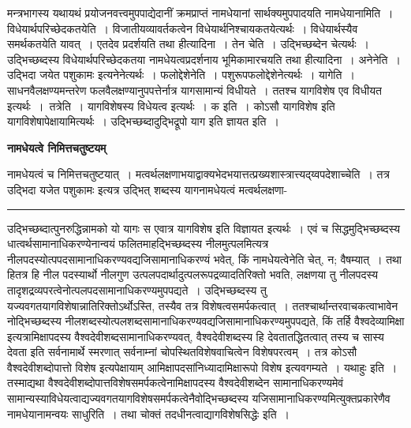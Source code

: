 \documentclass[11pt, openany]{book}
\begin{document}
 मन्त्रभागस्य यथायथं प्रयोजनवत्त्वमुपपाद्येदानीं क्रमप्राप्तं नामधेयानां  सार्थक्यमुपपादयति  {\br नामधेयानामिति~। विधेयार्थपरिच्छेदकतयेति~।} विजातीयव्यावर्तकत्वेन विधेयार्थनिश्चायकतयेत्यर्थः~। विधेयार्थस्यैव  समर्थकतयेति यावत्~। एतदेव प्रदर्शयति  {\br तथा हीत्यादिना~।} तेन चेति~। उद्भिच्छब्देन चेत्यर्थः~। उद्भिच्छब्दस्य विधेयार्थपरिच्छेदकतया नामधेयत्वप्रदर्शनाय भूमिकामारचयति {\br तथा हीत्यादिना~। अनेनेति~।} {\qt उद्भिदा जयेत पशुकामः} इत्यनेनेत्यर्थः~। {\br फलोद्देशेनेति~।}
पशुरूपफलोद्देशेनेत्यर्थः~। यागेति~। साधनवैलक्षण्यमन्तरेण फलवैलक्षण्यानुपपत्तेर्नात्र यागसामान्यं विधीयते~। ततश्च यागविशेष एव विधीयत इत्यर्थः~।~{\br तत्रेति~।} 
यागविशेषस्य विधेयत्व इत्यर्थः~। {\br क इति~।} कोऽसौ यागविशेष इति यागविशेषापेक्षायामित्यर्थः~। {\br उद्भिच्छब्दादुद्भिद्रूपो याग इति ज्ञायत इति~।}
\newpage
\fancyhead[LO]{[नामधेयत्वे नि० ]}
\begin{center}
 \textbf{नामधेयत्वे निमित्तचतुष्टयम् }   
\end{center}
 
{\bl नामधेयत्वं च निमित्तचतुष्टयात्~। मत्वर्थलक्षणाभयाद्वाक्यभेदभयात्तत्प्रख्यशास्त्रात्त्यद्य्वपदेशाच्चेति~। तत्र {\qtl उद्भिदा यजेत पशुकामः} इत्यत्र {\qtl उद्भित्}  शब्दस्य यागनामधेयत्वं मत्वर्थलक्षणा-\\ }
\hrule
\vspace{3mm}
\noindent
उद्भिच्छब्दात्पुनरुद्धिन्नामको यो यागः स एवात्र यागविशेष इति विज्ञायत  इत्यर्थः~। एवं च सिद्धमुद्भिच्छब्दस्य धात्वर्थसामानाधिकरण्येनान्वयं फलितमाहद्भिच्छब्दस्य नीलमुत्पलमित्यत्र नीलपदस्योत्पपदसामानाधिकरण्यवद्यजिसामानाधिकरण्यं भवेत्, किं नामधेयत्वेनेति चेत्, {\qt न}; वैषम्यात्~। तथा हि\textendash तत्र हि {\qt नील} पदस्यार्थो नीलगुण उत्पलपदार्थादुत्पलरूपद्रव्यादतिरिक्तो भवति, लक्षणया तु नीलपदस्य तादृशद्रव्यपरत्वेनोत्पलपदसामानाधिकरण्यमुपपद्यते~। उद्भिच्छब्दस्य तु यज्यवगतयागविशेषान्नातिरिक्तोऽर्थोऽस्ति, तस्यैव तत्र विशेषत्वसमर्पकत्वात्~।
ततश्चार्थान्तरवाचकत्वाभावेन नोद्भिच्छब्दस्य नीलशब्दस्योत्पलशब्दसामानाधिकरण्यवद्यजिसामानाधिकरण्यमुपपद्यते, किं तर्हि {\qt वैश्वदेव्यामिक्षा} इत्यत्रामिक्षापदस्य
वैश्वदेवीशब्दसामानाधिकरण्यवत्, वैश्वदेवीशब्दस्य हि देवतातद्धितत्वात् तस्य च {\qt सास्य देवता}  इति सर्वनामार्थे स्मरणात् सर्वनाम्नां चोपस्थितविशेषवाचित्वेन
विशेषपरत्वम्~। तत्र कोऽसौ वैश्वदेवीशब्दोपात्तो विशेष इत्यपेक्षायाम् आमिक्षापदसांनिध्यादामिक्षारूपो विशेष इत्यवगम्यते~। यथाहुः  इति~। तस्माद्यथा वैश्वदेवीशब्दोपात्तविशेषसमर्पकत्वेनामिक्षापदस्य वैश्वदेवीशब्देन सामानाधिकरण्यमेवं सामान्यस्याविधेयत्वाद्यज्यवगतयागविशेषसमर्पकत्वेनैवोद्भिच्छब्दस्य  यजिसामानाधिकरण्यमित्युक्तप्रकारेणैव नामधेयानामन्वयः साधुरिति~। तथा चोक्तं  {\qt तदधीनत्वाद्यागविशेषसिद्धेः} इति~।~\\
\end{document}
